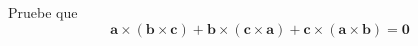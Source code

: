 \item Pruebe que 
    \[
    \mathbf{a} \times (\mathbf{b} \times \mathbf{c}) + \mathbf{b} \times (\mathbf{c} \times \mathbf{a}) + \mathbf{c} \times (\mathbf{a} \times \mathbf{b}) = \mathbf{0}
    \]
